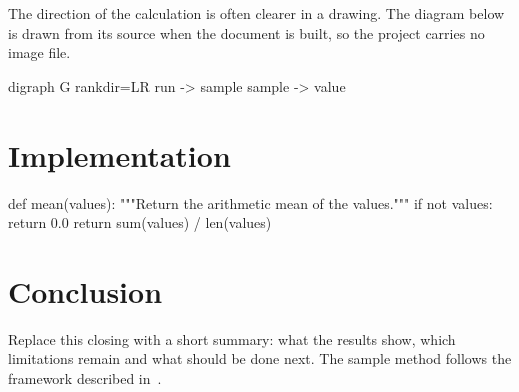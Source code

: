The direction of the calculation is often clearer in a drawing. The diagram
below is drawn from its source when the document is built, so the project
carries no image file.
\begin{graphviz}[style=editorial, pos=H, width=0.62\linewidth, caption={From a measured run to its reported value}]
  digraph G {
    rankdir=LR
    run -> sample
    sample -> value
  }
\end{graphviz}

\section{Implementation}
\begin{code}[lang=python]
def mean(values):
    """Return the arithmetic mean of the values."""
    if not values:
        return 0.0
    return sum(values) / len(values)
\end{code}

\section{Conclusion}
Replace this closing with a short summary: what the results show, which
limitations remain and what should be done next. The sample method follows
the framework described in~\cite{example}.
